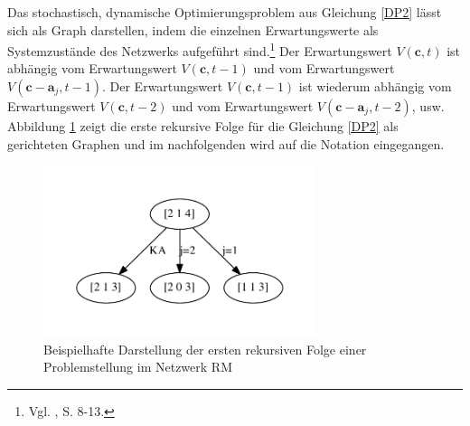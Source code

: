 Das stochastisch, dynamische Optimierungsproblem aus Gleichung \eqref{DP2} lässt sich als Graph darstellen, indem die einzelnen Erwartungswerte als Systemzustände des Netzwerks aufgeführt sind.\footnote{Vgl. \cite{demiguel2006multistage}, S. 8-13.} Der Erwartungswert $V(\textbf{c},t)$ ist abhängig vom Erwartungswert $V(\textbf{c},t-1)$ und vom Erwartungswert $V(\textbf{c}-\textbf{a}_{j},t-1)$. Der Erwartungswert $V(\textbf{c},t-1)$ ist wiederum abhängig vom Erwartungswert $V(\textbf{c},t-2)$ und vom Erwartungswert $V(\textbf{c}-\textbf{a}_{j},t-2)$, usw. Abbildung \ref{B0} zeigt die erste rekursive Folge für die Gleichung \eqref{DP2} als gerichteten Graphen und im nachfolgenden wird auf die Notation eingegangen.
\begin{figure}[h!]
  \begin{center}
    \includegraphics[width=80mm]{Bilder/Beispiel0.pdf}
    \caption{Beispielhafte Darstellung der ersten rekursiven Folge einer Problemstellung im Netzwerk RM}  \label{B0}
  \end{center}
\end{figure}

